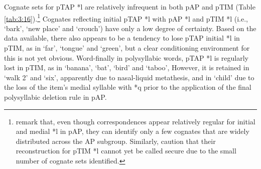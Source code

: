 Cognate sets for pTAP *l are relatively infrequent in both pAP and pTIM (Table \ref{tab:3:16}).\footnote{\citet{HoltonRobinsonTVhistory} remark that, even though correspondences appear relatively regular for initial and medial *l in pAP, they can identify only a few cognates that are widely distributed across the AP subgroup. Similarly, \citet{SchapperEtAl2012} caution that their reconstruction for pTIM *l cannot yet be called secure due to the small number of cognate sets identified.} Cognates reflecting initial pTAP *l with pAP *l and pTIM *l (i.e., `bark', `new place' and `crouch') have only a low degree of certainty. Based on the data available, there also appears to be a tendency to lose pTAP initial *l in pTIM, as in `far', `tongue' and `green', but a clear conditioning environment for this is not yet obvious. Word-finally in polysyllabic words, pTAP *l is regularly lost in pTIM, as in `banana', `bat', `bird' and `taboo', However, it is retained in `walk 2' and `six', apparently due to nasal-liquid metathesis, and in `child' due to the loss of the item's medial syllable with *q prior to the application of the final polysyllabic deletion rule in pAP.
 

